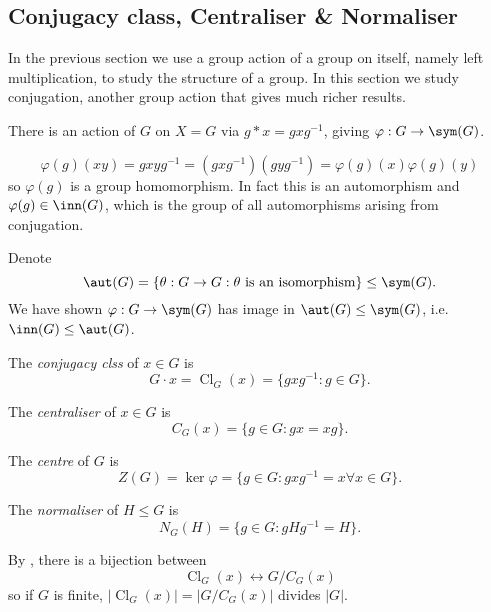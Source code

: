 \documentclass[a4paper]{article}
\theoremstyle{definition}
\DeclareMathOperator{\Cl}{Cl}
\begin{document}
\subsection{Conjugacy class, Centraliser \& Normaliser}

In the previous section we use a group action of a group on itself, namely left multiplication, to study the structure of a group. In this section we study conjugation, another group action that gives much richer results.

There is an action of \(G\) on \(X = G\) via \(g * x = gxg^{-1}\), giving \(\varphi: G \to \sym(G)\).

\begin{remark}
  \[
    \varphi(g)(xy) = gxyg^{-1} = (gxg^{-1})(gyg^{-1}) = \varphi(g)(x) \varphi(g)(y)
  \]
  so \(\varphi(g)\) is a group homomorphism. In fact this is an automorphism and \(\varphi(g) \in \inn(G)\), which is the group of all automorphisms arising from conjugation.
\end{remark}

Denote
\[
  \aut(G) = \{\theta: G \to G: \theta \text{ is an isomorphism}\} \leq \sym(G).
\]
We have shown \(\varphi: G \to \sym(G)\) has image in \(\aut(G) \leq \sym(G)\), i.e.\ \(\inn(G) \leq \aut(G)\).

\begin{definition}
  The \emph{conjugacy clss} of \(x \in G\) is
  \[
    G \cdot x = \Cl_G(x) = \{gxg^{-1}: g \in G\}.
  \]
\end{definition}

\begin{definition}[Centraliser]
  The \emph{centraliser} of \(x \in G\) is
  \[
    C_G(x) = \{g \in G: gx = xg\}.
  \]
\end{definition}

\begin{definition}[Centre]
  The \emph{centre} of \(G\) is
  \[
    Z(G) = \ker \varphi = \{g \in G: gxg^{-1} = x \forall x \in G\}.
  \]
\end{definition}

\begin{definition}[Normaliser]
  The \emph{normaliser} of \(H \leq G\) is
  \[
    N_G(H) = \{g \in G: gHg^{-1} = H\}.
  \]
\end{definition}

By , there is a bijection between
\[
  \Cl_G(x) \leftrightarrow G/C_G(x)
\]
so if \(G\) is finite, \(|\Cl_G(x)| = |G/C_G(x)|\) divides \(|G|\).
\end{document}
